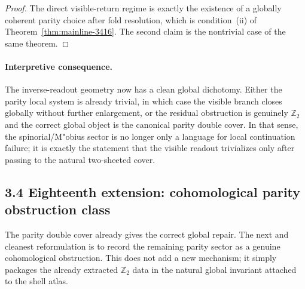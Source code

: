 \begin{proof}
The direct visible-return regime is exactly the existence of a globally coherent parity choice after fold resolution, which is condition~(ii) of Theorem~\ref{thm:mainline-3416}. The second claim is the nontrivial case of the same theorem.
\end{proof}

\paragraph{Interpretive consequence.}
The inverse-readout geometry now has a clean global dichotomy. Either the parity local system is already trivial, in which case the visible branch closes globally without further enlargement, or the residual obstruction is genuinely $\mathbb Z_2$ and the correct global object is the canonical parity double cover. In that sense, the spinorial/M"obius sector is no longer only a language for local continuation failure; it is exactly the statement that the visible readout trivializes only after passing to the natural two-sheeted cover.


\subsection*{3.4 Eighteenth extension: cohomological parity obstruction class}
The parity double cover already gives the correct global repair. The next and cleanest reformulation is to record the remaining parity sector as a genuine cohomological obstruction. This does not add a new mechanism; it simply packages the already extracted $\mathbb Z_2$ data in the natural global invariant attached to the shell atlas.

